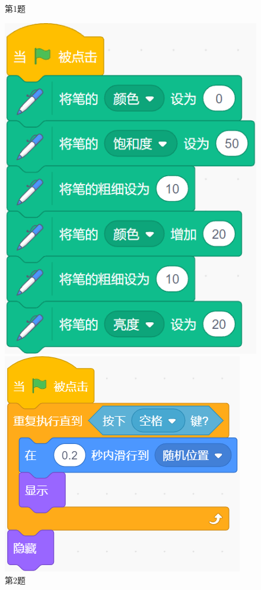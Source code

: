 \documentclass[10pt, a4paper]{article}
\begin{document}
\begin{enumerate}
\begin{figure}[htbp]
\begin{minipage}[t]{.09\textwidth}
                \caption*{第1题}
            \end{minipage}
            \begin{minipage}[t]{.17\textwidth}
                \centering
                \includegraphics[width=\textwidth]{2.png}
                \caption*{第2题}
            \end{minipage}
            \begin{minipage}[t]{.2\textwidth}
                \centering
                \includegraphics[width=\textwidth]{4.png}

\end{minipage}
\end{figure}
\end{enumerate}
\end{document}

